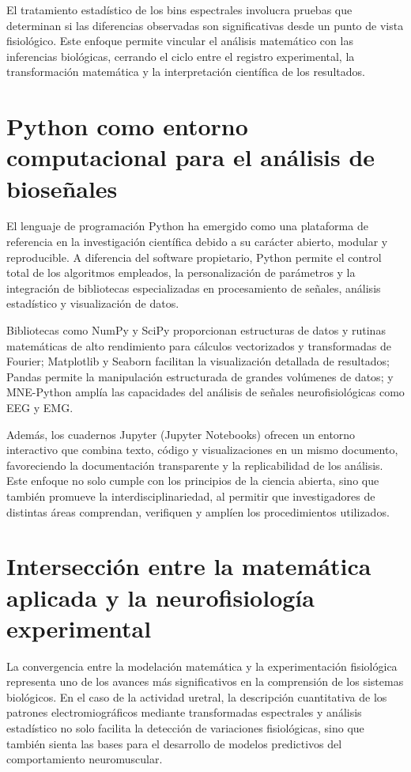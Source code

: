 El tratamiento estadístico de los bins espectrales involucra pruebas que determinan si las diferencias observadas son significativas desde un punto de vista fisiológico. Este enfoque permite vincular el análisis matemático con las inferencias biológicas, cerrando el ciclo entre el registro experimental, la transformación matemática y la interpretación científica de los resultados.


\section{Python como entorno computacional para el análisis de bioseñales}

El lenguaje de programación Python ha emergido como una plataforma de referencia en la investigación científica debido a su carácter abierto, modular y reproducible. A diferencia del software propietario, Python permite el control total de los algoritmos empleados, la personalización de parámetros y la integración de bibliotecas especializadas en procesamiento de señales, análisis estadístico y visualización de datos.

Bibliotecas como NumPy y SciPy proporcionan estructuras de datos y rutinas matemáticas de alto rendimiento para cálculos vectorizados y transformadas de Fourier; Matplotlib y Seaborn facilitan la visualización detallada de resultados; Pandas permite la manipulación estructurada de grandes volúmenes de datos; y MNE-Python amplía las capacidades del análisis de señales neurofisiológicas como EEG y EMG.

Además, los cuadernos Jupyter (Jupyter Notebooks) ofrecen un entorno interactivo que combina texto, código y visualizaciones en un mismo documento, favoreciendo la documentación transparente y la replicabilidad de los análisis. Este enfoque no solo cumple con los principios de la ciencia abierta, sino que también promueve la interdisciplinariedad, al permitir que investigadores de distintas áreas comprendan, verifiquen y amplíen los procedimientos utilizados.


\section{Intersección entre la matemática aplicada y la neurofisiología experimental}
La convergencia entre la modelación matemática y la experimentación fisiológica representa uno de los avances más significativos en la comprensión de los sistemas biológicos. En el caso de la actividad uretral, la descripción cuantitativa de los patrones electromiográficos mediante transformadas espectrales y análisis estadístico no solo facilita la detección de variaciones fisiológicas, sino que también sienta las bases para el desarrollo de modelos predictivos del comportamiento neuromuscular.

